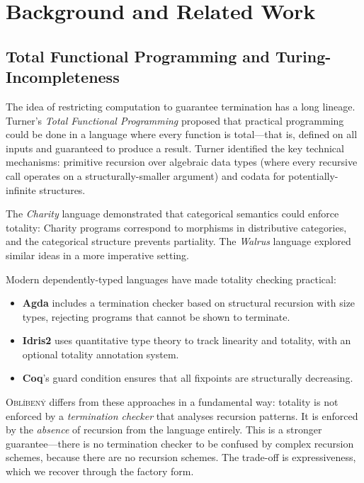 \documentclass[11pt,a4paper]{article}
\newcommand{\obl}{\textsc{Obl\'{i}ben\'{y}}}
\begin{document}
\section{Background and Related Work}
\label{sec:background}

\subsection{Total Functional Programming and Turing-Incompleteness}

The idea of restricting computation to guarantee termination has a long
lineage.  Turner's \emph{Total Functional Programming}
\citep{turner2004total} proposed that practical programming could be done in a
language where every function is total---that is, defined on all inputs and
guaranteed to produce a result.  Turner identified the key technical
mechanisms: primitive recursion over algebraic data types (where every
recursive call operates on a structurally-smaller argument) and codata for
potentially-infinite structures.

The \emph{Charity} language \citep{cockett1992charity} demonstrated that
categorical semantics could enforce totality: Charity programs correspond to
morphisms in distributive categories, and the categorical structure prevents
partiality.  The \emph{Walrus} language explored similar ideas in a more
imperative setting.

Modern dependently-typed languages have made totality checking practical:
\begin{itemize}[nosep]
  \item \textbf{Agda} \citep{norell2007towards} includes a termination
    checker based on structural recursion with size types, rejecting programs
    that cannot be shown to terminate.
  \item \textbf{Idris2} \citep{brady2021idris2} uses quantitative type
    theory to track linearity and totality, with an optional totality
    annotation system.
  \item \textbf{Coq}'s \citep{coq2024} guard condition ensures that all
    fixpoints are structurally decreasing.
\end{itemize}

\obl{} differs from these approaches in a fundamental way: totality is not
enforced by a \emph{termination checker} that analyses recursion patterns.  It
is enforced by the \emph{absence} of recursion from the language entirely.
This is a stronger guarantee---there is no termination checker to be confused
by complex recursion schemes, because there are no recursion schemes.  The
trade-off is expressiveness, which we recover through the factory form.
\end{document}
